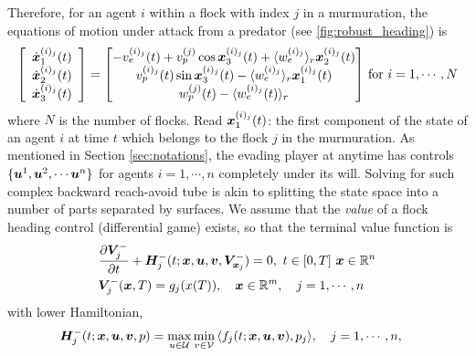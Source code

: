 Therefore, for an agent $i$ within a flock with index $j$ in a murmuration, the equations of motion under attack from a predator (see \autoref{fig:robust_heading}) is %
%
\begin{align}
\left[\begin{array}{c}
\dot{\state}_1^{(i)_j}(t) \\ \dot{\state}_2^{(i)_j} (t) \\ \dot{\state}_3^{(i)_j} (t)
\end{array}\right] = \begin{bmatrix}
-v_e^{(i)_j}(t) + v_p^{(j)} \cos \state_3^{(i)_j}(t) + \langle w_e^{(i)_j} \rangle_r \state_2^{(i)_j}(t)
%
\\
v_p^{(i)_j}(t)\sin \state_3^{(i)_j}(t) - \langle w_e^{(i)_j} \rangle_r \state_1^{(i)_j}(t)
\\ 
w_p^{(j)}(t) - \langle w_e^{(i)_j}(t) \rangle_r
\end{bmatrix} \, \text{for } i=1,\cdots, N
\end{align}
%
where $N$ is the number of flocks. Read ${\bm{x}}_1^{(i)_j}(t)$: the first component of the state of an agent $i$ at time $t$ which belongs to the flock $j$ in the murmuration. As mentioned in Section \ref{sec:notations}, the evading player at anytime has controls $\{\bm{u}^1, \bm{u}^2, \cdots \bm{u}^n\}$ for agents $i=1, \cdots, n$ completely  under its will. Solving for such complex backward reach-avoid tube is akin to splitting the state space into a number of parts separated by surfaces. 
We assume that the \textit{value} of a flock heading control (differential game) exists, so that the terminal value function is
%
\begin{subequations}
\begin{align}
&\frac{\partial \bm{V}^-_j}{\partial t} + \bm{H}^-_j (t; \bm{x}, \bm{u}, \bm{v}, \bm{V}^-_{\bm{x}_j}) = 0, \,\, t\in \left[0, T\right]\, \bm{x} \in \mathbb{R}^n  \\
&\bm{V}^-_j(\bm{x}, T) = g_j(x(T)), \quad \bm{x} \in \mathbb{R}^m , \quad j = 1, \cdots, n
\label{eq:lower_visc_boundary_surfaces}
\end{align}
\label{eq:lower_visc_surfaces}
\end{subequations}
%
with lower Hamiltonian, 
%
\begin{align}
&\bm{H}^-_j (t; \bm{x}, \bm{u}, \bm{v}, p) = \max_{u \in \mathcal{U}} \min_{v \in \mathcal{V}} \, \langle f_j(t; \bm{x}, \bm{u}, \bm{v}), p_j  \rangle, \quad j = 1, \cdots, n,
\label{eq:lower_visc_ham_surfaces}
\end{align}
